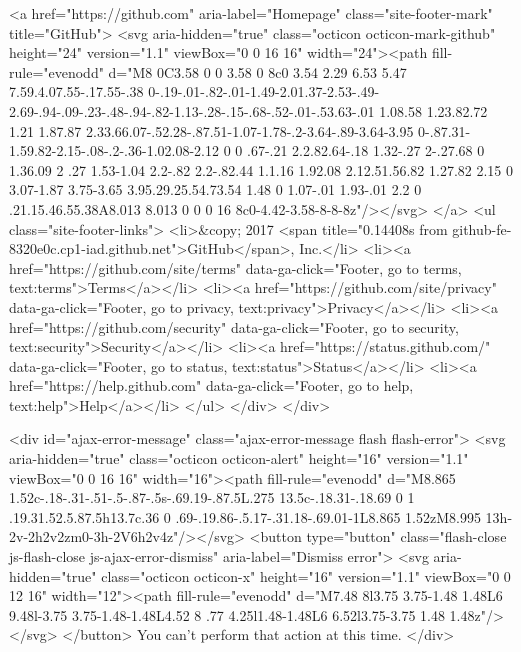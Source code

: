     <a href="https://github.com" aria-label="Homepage" class="site-footer-mark" title="GitHub">
      <svg aria-hidden="true" class="octicon octicon-mark-github" height="24" version="1.1" viewBox="0 0 16 16" width="24"><path fill-rule="evenodd" d="M8 0C3.58 0 0 3.58 0 8c0 3.54 2.29 6.53 5.47 7.59.4.07.55-.17.55-.38 0-.19-.01-.82-.01-1.49-2.01.37-2.53-.49-2.69-.94-.09-.23-.48-.94-.82-1.13-.28-.15-.68-.52-.01-.53.63-.01 1.08.58 1.23.82.72 1.21 1.87.87 2.33.66.07-.52.28-.87.51-1.07-1.78-.2-3.64-.89-3.64-3.95 0-.87.31-1.59.82-2.15-.08-.2-.36-1.02.08-2.12 0 0 .67-.21 2.2.82.64-.18 1.32-.27 2-.27.68 0 1.36.09 2 .27 1.53-1.04 2.2-.82 2.2-.82.44 1.1.16 1.92.08 2.12.51.56.82 1.27.82 2.15 0 3.07-1.87 3.75-3.65 3.95.29.25.54.73.54 1.48 0 1.07-.01 1.93-.01 2.2 0 .21.15.46.55.38A8.013 8.013 0 0 0 16 8c0-4.42-3.58-8-8-8z"/></svg>
</a>
    <ul class="site-footer-links">
      <li>&copy; 2017 <span title="0.14408s from github-fe-8320e0c.cp1-iad.github.net">GitHub</span>, Inc.</li>
        <li><a href="https://github.com/site/terms" data-ga-click="Footer, go to terms, text:terms">Terms</a></li>
        <li><a href="https://github.com/site/privacy" data-ga-click="Footer, go to privacy, text:privacy">Privacy</a></li>
        <li><a href="https://github.com/security" data-ga-click="Footer, go to security, text:security">Security</a></li>
        <li><a href="https://status.github.com/" data-ga-click="Footer, go to status, text:status">Status</a></li>
        <li><a href="https://help.github.com" data-ga-click="Footer, go to help, text:help">Help</a></li>
    </ul>
  </div>
</div>



  

  <div id="ajax-error-message" class="ajax-error-message flash flash-error">
    <svg aria-hidden="true" class="octicon octicon-alert" height="16" version="1.1" viewBox="0 0 16 16" width="16"><path fill-rule="evenodd" d="M8.865 1.52c-.18-.31-.51-.5-.87-.5s-.69.19-.87.5L.275 13.5c-.18.31-.18.69 0 1 .19.31.52.5.87.5h13.7c.36 0 .69-.19.86-.5.17-.31.18-.69.01-1L8.865 1.52zM8.995 13h-2v-2h2v2zm0-3h-2V6h2v4z"/></svg>
    <button type="button" class="flash-close js-flash-close js-ajax-error-dismiss" aria-label="Dismiss error">
      <svg aria-hidden="true" class="octicon octicon-x" height="16" version="1.1" viewBox="0 0 12 16" width="12"><path fill-rule="evenodd" d="M7.48 8l3.75 3.75-1.48 1.48L6 9.48l-3.75 3.75-1.48-1.48L4.52 8 .77 4.25l1.48-1.48L6 6.52l3.75-3.75 1.48 1.48z"/></svg>
    </button>
    You can't perform that action at this time.
  </div>


